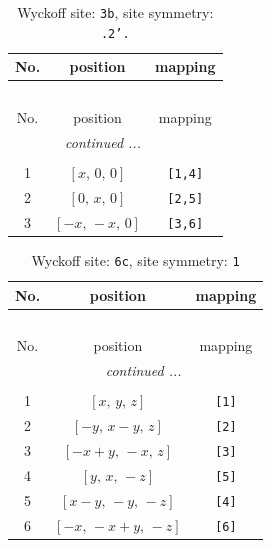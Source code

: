 \documentclass[fleqn,8pt]{jsarticle}
\begin{document}
\begin{longtable}{ccc}
\caption{Wyckoff site: {\tt 3b}, site symmetry: {\tt .2'.}}
 \\
 \hline \hline
No. & position & mapping \\ \hline \endfirsthead

\multicolumn{2}{l}{\tablename\ \thetable{}} \\
 \hline \hline
No. & position & mapping \\ \hline \endhead

 \hline \hline
\multicolumn{2}{r}{\footnotesize\it continued ...} \\ \endfoot

 \hline \hline
\multicolumn{2}{r}{} \\ \endlastfoot

1 & $\left[ x,\, 0,\, 0 \right]$ & {\tt [1,4]} \\ \hline
2 & $\left[ 0,\, x,\, 0 \right]$ & {\tt [2,5]} \\ \hline
3 & $\left[ - x,\, - x,\, 0 \right]$ & {\tt [3,6]} \\
\end{longtable}
\renewcommand{\arraystretch}{1.2}
\begin{longtable}{ccc}
\caption{Wyckoff site: {\tt 6c}, site symmetry: {\tt 1}}
 \\
 \hline \hline
No. & position & mapping \\ \hline \endfirsthead

\multicolumn{2}{l}{\tablename\ \thetable{}} \\
 \hline \hline
No. & position & mapping \\ \hline \endhead

 \hline \hline
\multicolumn{2}{r}{\footnotesize\it continued ...} \\ \endfoot

 \hline \hline
\multicolumn{2}{r}{} \\ \endlastfoot

1 & $\left[ x,\, y,\, z \right]$ & {\tt [1]} \\ \hline
2 & $\left[ - y,\, x - y,\, z \right]$ & {\tt [2]} \\ \hline
3 & $\left[ - x + y,\, - x,\, z \right]$ & {\tt [3]} \\ \hline
4 & $\left[ y,\, x,\, - z \right]$ & {\tt [5]} \\ \hline
5 & $\left[ x - y,\, - y,\, - z \right]$ & {\tt [4]} \\ \hline
6 & $\left[ - x,\, - x + y,\, - z \right]$ & {\tt [6]} \\
\end{longtable}
\end{document}
